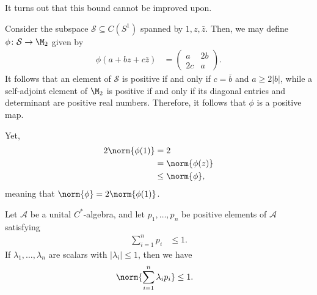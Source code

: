 \documentclass[10pt]{mypackage}
\begin{document}
It turns out that this bound cannot be improved upon.
\begin{example}
  Consider the subspace $\mathcal{S}\subseteq C\left( S^1 \right)$ spanned by $1,z,\bar{z}$. Then, we may define $\phi\colon \mathcal{S}\rightarrow \M_2$ given by
  \begin{align*}
    \phi\left( a + bz + c \bar{z} \right) &= \begin{pmatrix}a & 2b \\ 2c & a\end{pmatrix}.
  \end{align*}
  It follows that an element of $\mathcal{S}$ is positive if and only if $c = \overline{b}$ and $a \geq 2\left\vert b \right\vert$, while a self-adjoint element of $\M_2$ is positive if and only if its diagonal entries and determinant are positive real numbers. Therefore, it follows that $\phi$ is a positive map.

  Yet,
  \begin{align*}
    2\norm{\phi(1)} &= 2\\
                    &= \norm{\phi(z)}\\
                    &\leq \norm{\phi},
  \end{align*}
  meaning that $\norm{\phi} = 2\norm{\phi(1)}$.
\end{example}
\begin{lemma}
  Let $\mathcal{A}$ be a unital $C^{\ast}$-algebra, and let $p_1,\dots,p_n$ be positive elements of $\mathcal{A}$ satisfying
  \begin{align*}
    \sum_{i=1}^{n } p_i &\leq 1.
  \end{align*}
  If $\lambda_1,\dots,\lambda_n$ are scalars with $\left\vert \lambda_i \right\vert\leq 1$, then we have
  \begin{align*}
    \norm{\sum_{i=1}^{n}\lambda_ip_i} &\leq 1.
  \end{align*}
\end{lemma}
\end{document}
